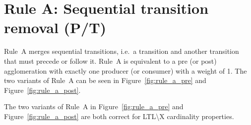 \section*{Rule A: Sequential transition removal (P/T)}\label{sec:rule_a}
Rule~A merges sequential transitions, i.e.\ a transition and another transition that must precede or follow it.
Rule~A is equivalent to a pre (or post) agglomeration with exactly one producer (or consumer) with a weight of 1.
The two variants of Rule~A can be seen in Figure~\ref{fig:rule_a_pre} and Figure~\ref{fig:rule_a_post}.

\begin{theorem}\label{theorem:rule_a}
    The two variants of Rule~A in Figure~\ref{fig:rule_a_pre} and Figure~\ref{fig:rule_a_post} are both correct for LTL\textbackslash X cardinality properties.
\end{theorem}

